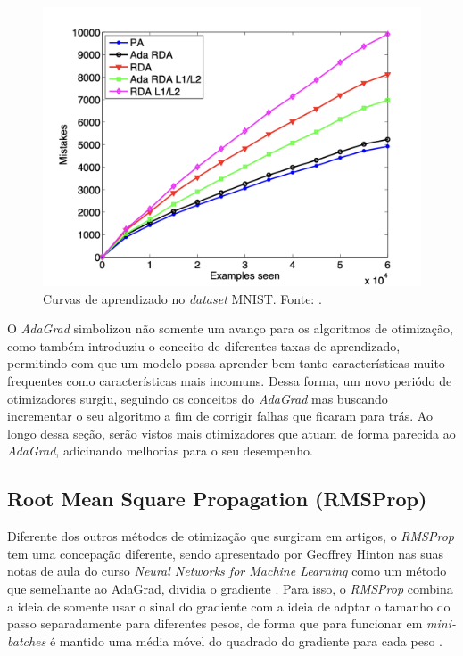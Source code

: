 \begin{figure}[h]
    \centering
    \includegraphics[width=0.65\linewidth]{../imagens/retropropagacao-gradiente/comparativo-adagrad-mnist.png}
    
    \caption[Curvas de aprendizado no MNIST]{%
        Curvas de aprendizado no \textit{dataset} MNIST.
        \newline %
        \small Fonte: \parencite{AdaGradMethod}.
    }
    \label{fig:curvas-de-aprendizado-adagrad-mnist}
\end{figure}

O \textit{AdaGrad} simbolizou não somente um avanço para os algoritmos de otimização, como também introduziu o conceito de diferentes taxas de aprendizado, permitindo com que um modelo possa aprender bem tanto características muito frequentes como características mais incomuns. Dessa forma, um novo periódo de otimizadores surgiu, seguindo os conceitos do \textit{AdaGrad} mas buscando incrementar o seu algoritmo a fim de corrigir falhas que ficaram para trás. Ao longo dessa seção, serão vistos mais otimizadores que atuam de forma parecida ao \textit{AdaGrad}, adicinando melhorias para o seu desempenho.

\subsection{Root Mean Square Propagation (RMSProp)}

Diferente dos outros métodos de otimização que surgiram em artigos, o \textit{RMSProp} tem uma concepação diferente, sendo apresentado por Geoffrey Hinton nas suas notas de aula do curso \textit{Neural Networks for Machine Learning} como um método que semelhante ao AdaGrad, dividia o gradiente \parencite{RMSPropMethod}. Para isso, o \textit{RMSProp} combina a ideia de somente usar o sinal do gradiente com a ideia de adptar o tamanho do passo separadamente para diferentes pesos, de forma que para funcionar em \textit{mini-batches} é mantido uma média móvel do quadrado do gradiente para cada peso \parencite{RMSPropMethod}.

